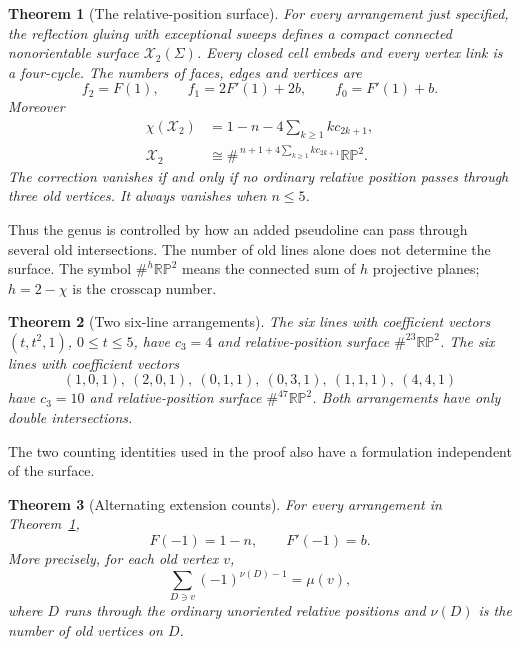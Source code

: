 \documentclass[11pt]{article}
\newtheorem{theorem}{Theorem}[section]
\theoremstyle{definition}\newtheorem{definition}[theorem]{Definition}
\newcommand{\RP}{\mathbb{RP}}
\begin{document}
\begin{theorem}[The relative-position surface]\label{thm:main}
For every arrangement just specified, the reflection gluing with
exceptional sweeps defines a compact connected nonorientable surface
$\mathcal X_2(\Sigma)$. Every closed cell embeds and every vertex link
is a four-cycle. The numbers of faces, edges and vertices are
\[
 f_2=F(1),\qquad f_1=2F'(1)+2b,\qquad f_0=F'(1)+b.
\]
Moreover
\begin{align*}
 \chi(\mathcal X_2)&=1-n-4\sum_{k\geq1}k c_{2k+1},\\
 \mathcal X_2&\cong
 \#^{\,n+1+4\sum_{k\geq1}k c_{2k+1}}\RP^2.
\end{align*}
The correction vanishes if and only if no ordinary relative position
passes through three old vertices. It always vanishes when $n\leq5$.
\end{theorem}

Thus the genus is controlled by how an added pseudoline can pass through
several old intersections. The number of old lines alone does not
determine the surface. The symbol $\#^h\RP^2$ means the connected sum
of $h$ projective planes; $h=2-\chi$ is the crosscap number.

\begin{theorem}[Two six-line arrangements]\label{thm:examples}
The six lines with coefficient vectors $(t,t^2,1)$, $0\leq t\leq5$,
have $c_3=4$ and relative-position surface $\#^{23}\RP^2$.
The six lines with coefficient vectors
\[
 (1,0,1),\ (2,0,1),\ (0,1,1),\ (0,3,1),\ (1,1,1),\ (4,4,1)
\]
have $c_3=10$ and relative-position surface $\#^{47}\RP^2$.
Both arrangements have only double intersections.
\end{theorem}

The two counting identities used in the proof also have a formulation
independent of the surface.
\begin{theorem}[Alternating extension counts]\label{thm:identities}
For every arrangement in Theorem~\ref{thm:main},
\[
 F(-1)=1-n,\qquad F'(-1)=b.
\]
More precisely, for each old vertex $v$,
\[
 \sum_{D\ni v}(-1)^{\nu(D)-1}=\mu(v),
\]
where $D$ runs through the ordinary unoriented relative positions and
$\nu(D)$ is the number of old vertices on $D$.
\end{theorem}
\end{document}
